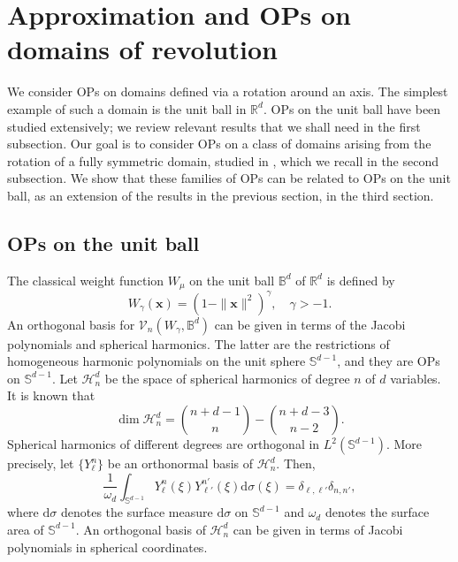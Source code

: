 \documentclass{amsart}
\theoremstyle{remark}
\def\la{{\langle}}
\def\ra{{\rangle}}
\def\d{\mathrm{d}}
\def\sph{{\mathbb{S}^{d-1}}}
\def\g{{\gamma}}
\def\l{{\lambda}}
\def\o{{\omega}}
\def\s{\sigma}
\def\la{{\langle}}
\def\ra{{\rangle}}
\def\xb{{\mathbf x}}
\def\CH{{\mathcal H}}
\def\CV{{\mathcal V}}
\def\BB{{\mathbb B}}
\def\RR{{\mathbb R}}
\def\proj{\operatorname{proj}}
\def\f{\frac}
\begin{document}
\section{Approximation and OPs on domains of revolution}
\setcounter{equation}{0}

We consider OPs on domains defined via a rotation around an axis. The simplest example of such a 
domain is the unit ball in $\RR^d$. OPs on the unit ball have been studied extensively; we review
relevant results that we shall need in the first subsection. Our goal is to consider OPs on a class of 
domains arising from the rotation of a fully symmetric domain, studied in \cite{X24}, which we recall 
in the second subsection. We show that these families of OPs can be related to OPs on the unit 
ball, as an extension of the results in the previous section, in the third section. 

\subsection{OPs on the unit ball} 
The classical weight function $W_\mu$ on the unit ball $\BB^d$ of $\RR^d$ is defined by 
$$
       W_\g (\xb) = (1-\|\xb\|^2)^{\g}, \quad \g > -1. 
$$
An orthogonal basis for $\CV_n(W_\g, \BB^d)$ can be given in terms of the Jacobi polynomials and 
spherical harmonics. The latter are the restrictions of homogeneous harmonic polynomials on the unit 
sphere $\sph$, and they are OPs on $\sph$. Let $\CH_n^d$ be the space of spherical harmonics of degree 
$n$ of $d$ variables. It is known that
\begin{equation} \label{eq:dimHnd}
 \dim \CH_n^d = \binom{n+d-1}{n} - \binom{n+d-3}{n-2}.
\end{equation}
Spherical harmonics of different degrees are orthogonal in $L^2(\sph)$. More precisely, let $\{Y_\ell^n\}$
be an orthonormal basis of $\CH_n^d$. Then, 
$$
   \frac{1}{\o_d} \int_{\sph} Y_\ell^n(\xi) Y_{\ell'}^{n'} (\xi) \d \s(\xi) =  \delta_{\ell,\ell'} \delta_{n,n'}, 
$$
where $\d \s$ denotes the surface measure $\d \s$ on $\sph$ and $\o_d$ denotes the surface area of $\sph$.
An orthogonal basis of $\CH_n^d$ can be given in terms of Jacobi polynomials in spherical coordinates. 
\end{document}
